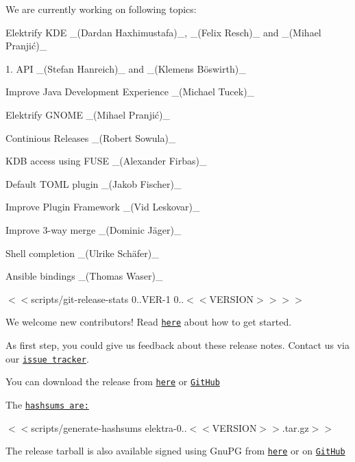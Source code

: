 We are currently working on following topics\+:


\begin{DoxyItemize}
\item Elektrify K\+DE \+\_\+(\+Dardan Haxhimustafa)\+\_\+, \+\_\+(\+Felix Resch)\+\_\+ and \+\_\+(Mihael Pranjić)\+\_\+
\item 1. A\+PI \+\_\+(\+Stefan Hanreich)\+\_\+ and \+\_\+(Klemens Böswirth)\+\_\+
\item Improve Java Development Experience \+\_\+(\+Michael Tucek)\+\_\+
\item Elektrify G\+N\+O\+ME \+\_\+(Mihael Pranjić)\+\_\+
\item Continious Releases \+\_\+(\+Robert Sowula)\+\_\+
\item K\+DB access using F\+U\+SE \+\_\+(\+Alexander Firbas)\+\_\+
\item Default T\+O\+ML plugin \+\_\+(\+Jakob Fischer)\+\_\+
\item Improve Plugin Framework \+\_\+(\+Vid Leskovar)\+\_\+
\item Improve 3-\/way merge \+\_\+(Dominic Jäger)\+\_\+
\item Shell completion \+\_\+(Ulrike Schäfer)\+\_\+
\item Ansible bindings \+\_\+(\+Thomas Waser)\+\_\+
\end{DoxyItemize}

$<$$<${\ttfamily scripts/git-\/release-\/stats 0..\+V\+ER-\/1 0..$<$$<$V\+E\+R\+S\+I\+ON$>$$>$}$>$$>$

We welcome new contributors! Read \href{https://www.libelektra.org/devgettingstarted/ideas}{\tt here} about how to get started.

As first step, you could give us feedback about these release notes. Contact us via our \href{https://issues.libelektra.org}{\tt issue tracker}.

You can download the release from \href{https://www.libelektra.org/ftp/elektra/releases/elektra-0.9.<<VERSION>>.tar.gz}{\tt here} or \href{https://github.com/ElektraInitiative/ftp/blob/master/releases/elektra-0.9.<<VERSION>>.tar.gz?raw=true}{\tt Git\+Hub}

The \href{https://github.com/ElektraInitiative/ftp/blob/master/releases/elektra-0.9.<<VERSION>>.tar.gz.hashsum?raw=true}{\tt hashsums are\+:}

$<$$<${\ttfamily scripts/generate-\/hashsums elektra-\/0..$<$$<$V\+E\+R\+S\+I\+ON$>$$>$.tar.\+gz}$>$$>$

The release tarball is also available signed using Gnu\+PG from \href{https://www.libelektra.org/ftp/elektra/releases/elektra-0.9.<<VERSION>>.tar.gz.gpg}{\tt here} or on \href{https://github.com/ElektraInitiative/ftp/blob/master/releases/elektra-0.9.<<VERSION>>.tar.gz.gpg?raw=true}{\tt Git\+Hub}

